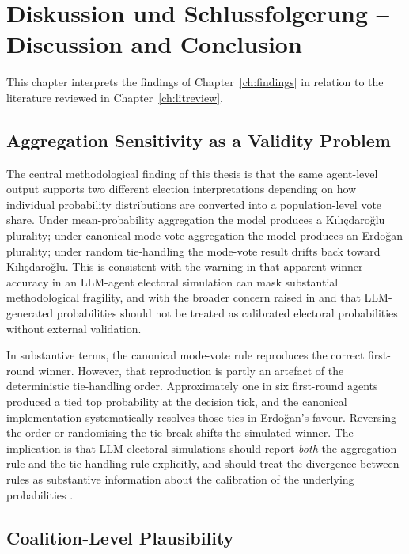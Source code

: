\documentclass[12pt,a4paper]{report}
\begin{document}
\chapter{Diskussion und Schlussfolgerung -- Discussion and Conclusion}
\label{ch:discussion}

This chapter interprets the findings of Chapter~\ref{ch:findings} in relation to the literature reviewed in Chapter~\ref{ch:litreview}.

\section{Aggregation Sensitivity as a Validity Problem}
\label{sec:disc_aggregation}

The central methodological finding of this thesis is that the same agent-level output supports two different election interpretations depending on how individual probability distributions are converted into a population-level vote share. Under mean-probability aggregation the model produces a Kılıçdaroğlu plurality; under canonical mode-vote aggregation the model produces an Erdoğan plurality; under random tie-handling the mode-vote result drifts back toward Kılıçdaroğlu. This is consistent with the warning in \citet{kang2026dynamok} that apparent winner accuracy in an LLM-agent electoral simulation can mask substantial methodological fragility, and with the broader concern raised in \citet{qu2024performance} and \citet{rettenberger2025politicalbias} that LLM-generated probabilities should not be treated as calibrated electoral probabilities without external validation.

In substantive terms, the canonical mode-vote rule reproduces the correct first-round winner. However, that reproduction is partly an artefact of the deterministic tie-handling order. Approximately one in six first-round agents produced a tied top probability at the decision tick, and the canonical implementation systematically resolves those ties in Erdoğan's favour. Reversing the order or randomising the tie-break shifts the simulated winner. The implication is that LLM electoral simulations should report \emph{both} the aggregation rule and the tie-handling rule explicitly, and should treat the divergence between rules as substantive information about the calibration of the underlying probabilities \citep{kreutner2026ep}.

\section{Coalition-Level Plausibility}
\label{sec:disc_coalition}
\end{document}
